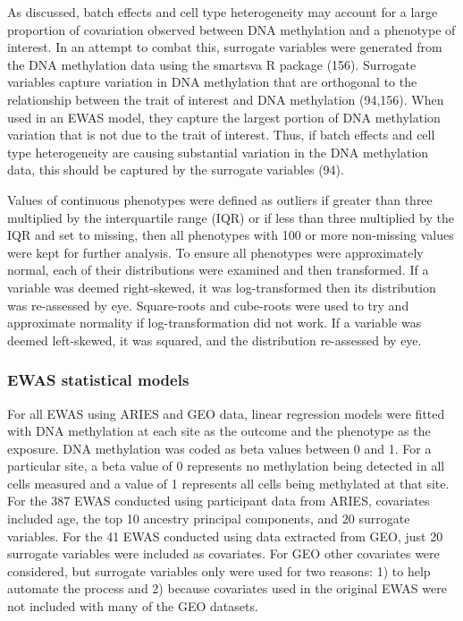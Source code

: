 \documentclass[11pt,twoside]{bristolthesis}
\begin{document}
As discussed, batch effects and cell type heterogeneity may account for a large proportion of covariation observed between DNA methylation and a phenotype of interest. In an attempt to combat this, surrogate variables were generated from the DNA methylation data using the smartsva R package (156). Surrogate variables capture variation in DNA methylation that are orthogonal to the relationship between the trait of interest and DNA methylation (94,156). When used in an EWAS model, they capture the largest portion of DNA methylation variation that is not due to the trait of interest. Thus, if batch effects and cell type heterogeneity are causing substantial variation in the DNA methylation data, this should be captured by the surrogate variables (94).

Values of continuous phenotypes were defined as outliers if greater than three multiplied by the interquartile range (IQR) or if less than three multiplied by the IQR and set to missing, then all phenotypes with 100 or more non-missing values were kept for further analysis. To ensure all phenotypes were approximately normal, each of their distributions were examined and then transformed. If a variable was deemed right-skewed, it was log-transformed then its distribution was re-assessed by eye. Square-roots and cube-roots were used to try and approximate normality if log-transformation did not work. If a variable was deemed left-skewed, it was squared, and the distribution re-assessed by eye.

\hypertarget{ewas-statistical-models}{%
\subsubsection{EWAS statistical models}\label{ewas-statistical-models}}

For all EWAS using ARIES and GEO data, linear regression models were fitted with DNA methylation at each site as the outcome and the phenotype as the exposure. DNA methylation was coded as beta values between 0 and 1. For a particular site, a beta value of 0 represents no methylation being detected in all cells measured and a value of 1 represents all cells being methylated at that site. For the 387 EWAS conducted using participant data from ARIES, covariates included age, the top 10 ancestry principal components, and 20 surrogate variables. For the 41 EWAS conducted using data extracted from GEO, just 20 surrogate variables were included as covariates. For GEO other covariates were considered, but surrogate variables only were used for two reasons: 1) to help automate the process and 2) because covariates used in the original EWAS were not included with many of the GEO datasets.
\end{document}
